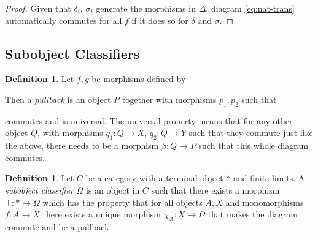 \documentclass[12pt]{article}
\theoremstyle{definition}
\newtheorem{definition}[theorem]{Definition}
\newcommand{\1}{\mathbbm{1}}
\begin{document}
\begin{proof}
    Given that $\delta_i$, $\sigma_i$ generate the morphisms in $\Delta$, diagram \ref{eq:nat-trans} automatically commutes for all $f$ if it does so for $\delta$ and $\sigma$.
\end{proof}

\subsection{Subobject Classifiers}
\begin{definition}
    Let $f, g$ be morphisms defined by
    \begin{center}
    \end{center}

    Then a \emph{pullback} is an object $P$ together with morphisms $p_1, p_2$ such that 
    \begin{center}
    \end{center}
    commutes and is universal. The universal property means that for any other object $Q$, with morphisms $q_1: Q\to X$, $q_2: Q\to Y$ such that they commute just like the above, there needs to be a morphism $\beta: Q\to P$ such that this whole diagram commutes. 

    \begin{center}
    \end{center}
\end{definition}

\begin{definition}
    Let $C$ be a category with a terminal object $*$ and finite limits. A \emph{subobject classifier} $\Omega$ is an object in $C$ such that there exists a morphism $\top: * \to \Omega$ which has the property that for all objects $A, X$ and monomorphisms $f: A\to X$ there exists a unique morphism $\chi_A: X\to \Omega$ that makes the diagram commute and be a pullback
    \begin{center}
    \end{center}
\end{definition}
\end{document}
